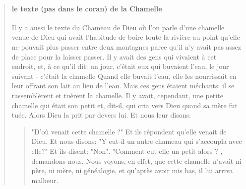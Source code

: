 \begin{quote}
{\paragraph{le texte (pas dans le coran) de la Chamelle}
Il y a aussi le texte du Chameau de Dieu où l'on parle d'une chamelle venue de Dieu qui avait l'habitude de boire toute la rivière au point qu'elle ne pouvait plus passer entre deux montagnes parce qu'il n'y avait pas assez de place pour la laisser passer. Il y avait des gens qui vivaient à cet endroit, et, à ce qu'il dit: un jour, c'était eux qui buvaient l'eau, le jour suivant - c'était la chamelle Quand elle buvait l'eau, elle les nourrissait en leur offrant son lait au lieu de l'eau. Mais ces gens étaient méchants: il se rassemblèrent et tuèrent la chamelle. Il y avait, cependant, une petite chamelle qui était son petit et, dit-il, qui cria vers Dieu quand sa mère fut tuée. Alors Dieu la prit par devers lui. Et nous leur disons: \begin{quote}
    "D'où venait cette chamelle ?" Et ils répondent qu'elle venait de Dieu. Et nous disons: "Y eut-il un autre chameau qui s'accoupla avec elle?" Et ils disent: "Non". "Comment eut elle un petit alors ? , demandons-nous. Nous voyons, en effet, que cette chamelle n'avait ni père, ni mère, ni généalogie, et qu'après avoir mis bas, il lui arriva malheur.
\end{quote} 
}
\end{quote}
